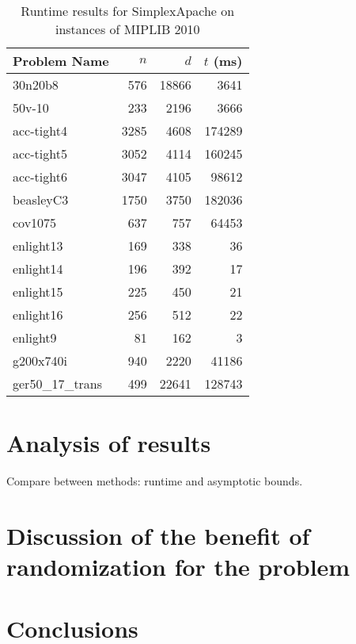 \documentclass[nocopyrightspace]{acm_proc_article-sp}
\begin{document}
\begin{table}[h!]
\label{tab:miplibresults}
\caption{Runtime results for SimplexApache on instances of MIPLIB 2010 \cite{KochEtAl2011}}
\begin{tabularx}{\columnwidth}{|X|r|r|r|}
\hline
Problem Name     & $n$  & $d$   & $t$ (ms) \\ \hline
30n20b8          & 576  & 18866 & 3641   \\ \hline
50v-10           & 233  & 2196  & 3666   \\ \hline
acc-tight4       & 3285 & 4608  & 174289 \\ \hline
acc-tight5       & 3052 & 4114  & 160245 \\ \hline
acc-tight6       & 3047 & 4105  & 98612  \\ \hline
beasleyC3        & 1750 & 3750  & 182036 \\ \hline
cov1075          & 637  & 757   & 64453  \\ \hline
enlight13        & 169  & 338   & 36     \\ \hline
enlight14        & 196  & 392   & 17     \\ \hline
enlight15        & 225  & 450   & 21     \\ \hline
enlight16        & 256  & 512   & 22     \\ \hline
enlight9         & 81   & 162   & 3      \\ \hline
g200x740i        & 940  & 2220  & 41186  \\ \hline
ger50\_17\_trans & 499  & 22641 & 128743 \\ \hline
\end{tabularx}
\end{table}


\section{Analysis of results}
Compare between methods: runtime and asymptotic bounds.

\section{Discussion of the benefit of randomization for the problem}

\section{Conclusions}



\balancecolumns
\end{document}
